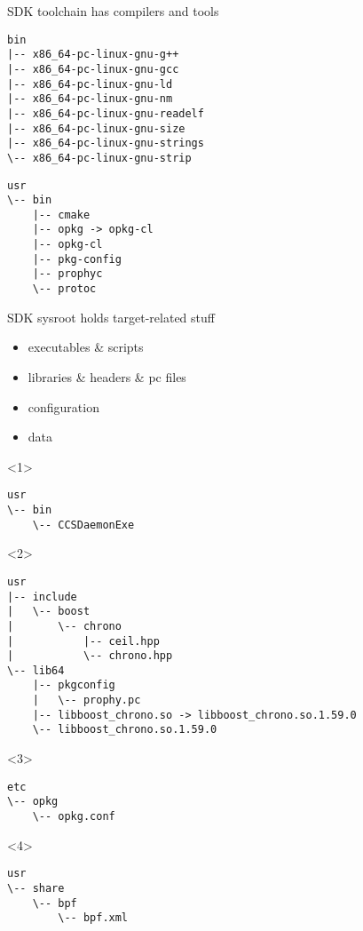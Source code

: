 \documentclass{beamer}
\begin{document}
\begin{frame}[fragile]{SDK toolchain has compilers and tools}
\begin{lstlisting}[style=TinyConsole]
bin
|-- x86_64-pc-linux-gnu-g++
|-- x86_64-pc-linux-gnu-gcc
|-- x86_64-pc-linux-gnu-ld
|-- x86_64-pc-linux-gnu-nm
|-- x86_64-pc-linux-gnu-readelf
|-- x86_64-pc-linux-gnu-size
|-- x86_64-pc-linux-gnu-strings
\-- x86_64-pc-linux-gnu-strip
\end{lstlisting}
\begin{lstlisting}[style=TinyConsole]
usr
\-- bin
    |-- cmake
    |-- opkg -> opkg-cl
    |-- opkg-cl
    |-- pkg-config
    |-- prophyc
    \-- protoc
\end{lstlisting}
\end{frame}

\begin{frame}[fragile, t]{SDK sysroot holds target-related stuff}
    \begin{block}{}
        \begin{itemize}
            \item<1->{executables \& scripts}
            \item<2->{libraries \& headers \& pc files}
            \item<3->{configuration}
            \item<4->{data}
        \end{itemize}
    \end{block}
    \begin{onlyenv}<1>
\begin{lstlisting}[style=TinyConsole]
usr
\-- bin
    \-- CCSDaemonExe
\end{lstlisting}
    \end{onlyenv}
    \begin{onlyenv}<2>
\begin{lstlisting}[style=TinyConsole]
usr
|-- include
|   \-- boost
|       \-- chrono
|           |-- ceil.hpp
|           \-- chrono.hpp
\-- lib64
    |-- pkgconfig
    |   \-- prophy.pc
    |-- libboost_chrono.so -> libboost_chrono.so.1.59.0
    \-- libboost_chrono.so.1.59.0
\end{lstlisting}
    \end{onlyenv}
    \begin{onlyenv}<3>
\begin{lstlisting}[style=TinyConsole]
etc
\-- opkg
    \-- opkg.conf
\end{lstlisting}
    \end{onlyenv}
    \begin{onlyenv}<4>
\begin{lstlisting}[style=TinyConsole]
usr
\-- share
    \-- bpf
        \-- bpf.xml
\end{lstlisting}
    \end{onlyenv}
\end{frame}
\end{document}
